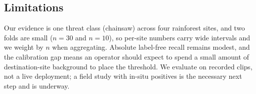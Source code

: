 \subsection{Limitations}

Our evidence is one threat class (chainsaw) across four rainforest sites, and two
folds are small ($n=30$ and $n=10$), so per-site numbers carry wide intervals and
we weight by $n$ when aggregating. Absolute label-free recall remains modest, and
the calibration gap means an operator should expect to spend a small amount of
destination-site background to place the threshold. We evaluate on recorded
clips, not a live deployment; a field study with in-situ positives is the
necessary next step and is underway.
